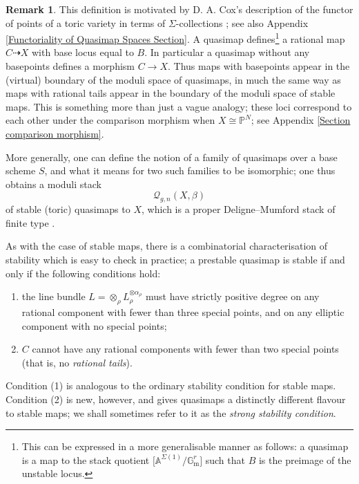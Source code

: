 \documentclass[11pt]{amsart}
\newcommand{\Q}[4]{\mathcal{Q}_{#1,#2}(#3,#4)}
\newcommand{\PP}{\mathbb P}
\renewcommand{\to}{\rightarrow}
\newcommand{\Gm}{\mathbb{G}_{\text{m}}}
\theoremstyle{definition}
\theoremstyle{definition}
\newtheorem{remark}[thm]{Remark}
\newcommand{\ilemph}[1]{\emph{#1}}
\begin{document}
\begin{remark} This definition is motivated by D. A. Cox's description of the functor of points of a toric variety in terms of $\Sigma$-collections \cite{CoxFunctor}; see also Appendix \ref{Functoriality of Quasimap Spaces Section}. A quasimap defines\footnote{This can be expressed in a more generalisable manner as follows: a quasimap is a map to the stack quotient $\big[\mathbb{A}^{\Sigma(1)} / \Gm^r\big]$ such that $B$ is the preimage of the unstable locus.} a rational map $C \dashrightarrow X$ with base locus equal to $B$.
In particular a quasimap without any basepoints defines a morphism $C \to X$. Thus maps with basepoints appear in the (virtual) boundary of the moduli space of quasimaps, in much the same way as maps with rational tails appear in the boundary of the moduli space of stable maps. This is something more than just a vague analogy; these loci correspond to each other under the comparison morphism when $X\cong\PP^N$; see Appendix \ref{Section comparison morphism}. \end{remark}

More generally, one can define the notion of a family of quasimaps over a base scheme $S$, and what it means for two such families to be isomorphic; one thus obtains a moduli stack
\begin{equation*} \Q{g}{n}{X}{\beta} \end{equation*}
of stable (toric) quasimaps to $X$, which is a proper Deligne--Mumford stack of finite type \cite[\S 3]{CF-K}.

\medskip

As with the case of stable maps, there is a combinatorial characterisation of stability which is easy to check in practice; a prestable quasimap is stable if and only if the following conditions hold:
\begin{enumerate}
\item the line bundle $L = \otimes_\rho L_\rho^{\otimes \alpha_\rho}$ must have strictly positive degree on any rational component with fewer than three special points, and on any elliptic component with no special points;
\item $C$ cannot have any rational components with fewer than two special points (that is, no \emph{rational tails}).
\end{enumerate}
Condition (1) is analogous to the ordinary stability condition for stable maps. Condition (2) is new, however, and gives quasimaps a distinctly different flavour to stable maps; we shall sometimes refer to it as the \ilemph{strong stability condition}. 
\end{document}
